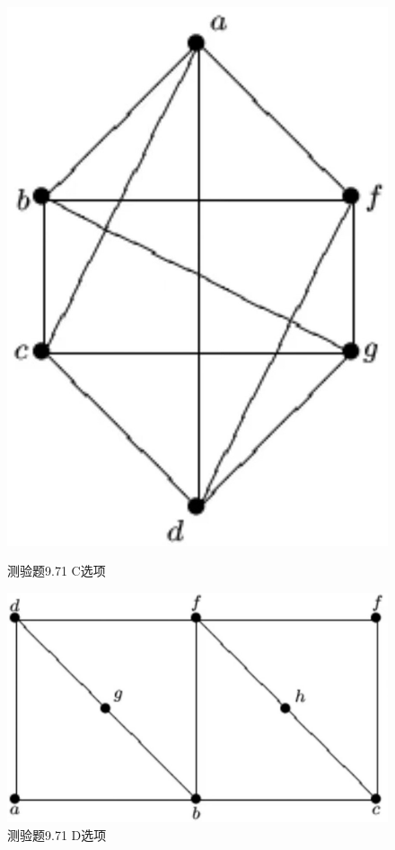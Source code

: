 \documentclass[UTF8, heading=true]{ctexart}
\begin{document}
\begin{figure}[H]
  \centering
  \begin{minipage}[t]{0.2\textwidth}
      \centering
      \includegraphics[width=1\textwidth]{9.67_3.jpg} %
      \vspace{-0.3cm}
      \caption{测验题9.71 C选项}
  \end{minipage}
  \hspace{0.22\textwidth} %
  \begin{minipage}[t]{0.35\textwidth}
      \centering
      \includegraphics[width=1\textwidth]{9.67_4.jpg} %
      \vspace{-0.3cm}
      \caption{测验题9.71 D选项}
\end{minipage}
\end{figure}
\end{document}

